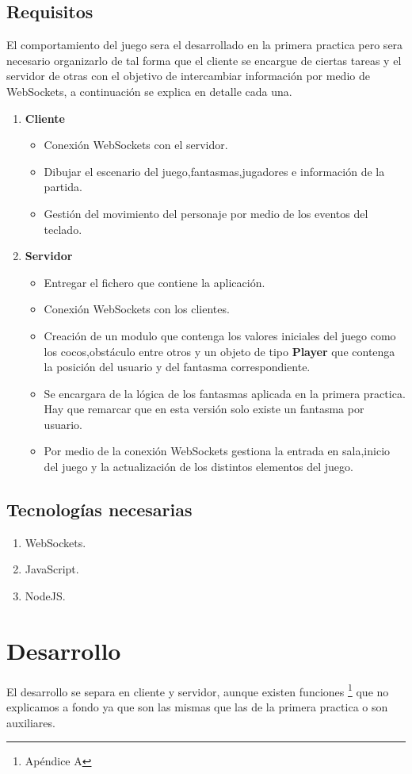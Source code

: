 \subsection{Requisitos}
El comportamiento del juego sera el desarrollado en la primera practica pero sera necesario organizarlo de tal forma que el cliente se encargue de ciertas tareas y el servidor de otras con el objetivo de intercambiar información por medio de WebSockets, a continuación se explica en detalle cada una.
\begin{enumerate}
\item\textbf{Cliente}
\begin{itemize}
\item  Conexión WebSockets con el servidor.
\item  Dibujar el escenario del juego,fantasmas,jugadores e información de la partida.
\item  Gestión del movimiento del personaje por medio de los eventos del teclado.
\end{itemize}
\item\textbf{Servidor}
\begin{itemize}
\item Entregar el fichero que contiene la aplicación.
\item Conexión WebSockets con los clientes.
\item Creación de un modulo que contenga los valores iniciales del juego como los cocos,obstáculo entre otros y un objeto de tipo \textbf{Player} que contenga la posición del usuario y del fantasma correspondiente.
\item Se encargara de la lógica de los fantasmas aplicada en la primera practica. Hay que remarcar que en esta versión solo existe un fantasma por usuario.
\item Por medio de la conexión WebSockets gestiona la entrada en sala,inicio del juego y la actualización de los distintos elementos del juego.
\end{itemize}
\end{enumerate}
\subsection{Tecnologías necesarias}
  \begin{enumerate}
    \item WebSockets.
    \item JavaScript.
    \item NodeJS.
  \end{enumerate}
\section{Desarrollo}
El desarrollo se separa en cliente y servidor, aunque existen funciones \footnote{Apéndice A} que no explicamos a fondo ya que son las mismas que las de la primera practica o son auxiliares.
